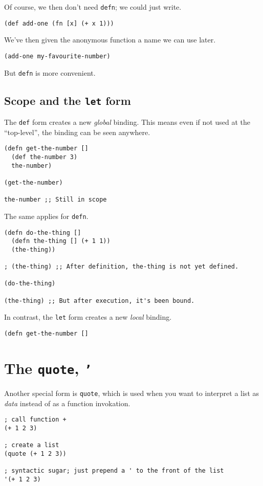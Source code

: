 \documentclass[11pt]{article}
\begin{document}
Of course, we then don't need \texttt{defn}; we could just write.
\begin{verbatim}
(def add-one (fn [x] (+ x 1)))
\end{verbatim}

We've then given the anonymous function a name we can use later.
\begin{verbatim}
(add-one my-favourite-number)
\end{verbatim}

But \texttt{defn} is more convenient.

\subsection{Scope and the \texttt{let} form}
\label{sec:org8220819}
The \texttt{def} form creates a new \emph{global} binding.
This means even if not used at the “top-level”,
the binding can be seen anywhere.
\begin{verbatim}
(defn get-the-number []
  (def the-number 3)
  the-number)

(get-the-number)

the-number ;; Still in scope
\end{verbatim}

The same applies for \texttt{defn}.
\begin{verbatim}
(defn do-the-thing []
  (defn the-thing [] (+ 1 1))
  (the-thing))

; (the-thing) ;; After definition, the-thing is not yet defined.

(do-the-thing)

(the-thing) ;; But after execution, it's been bound.
\end{verbatim}

In contrast, the \texttt{let} form creates a new \emph{local} binding.
\begin{verbatim}
(defn get-the-number []
\end{verbatim}

\section{The \texttt{quote}, \texttt{'}}
\label{sec:orga6e046e}
Another special form is \texttt{quote}, which is used
when you want to interpret a list as \emph{data} instead
of as a function invokation.
\begin{verbatim}
; call function +
(+ 1 2 3)

; create a list
(quote (+ 1 2 3))

; syntactic sugar; just prepend a ' to the front of the list
'(+ 1 2 3)
\end{verbatim}
\end{document}

